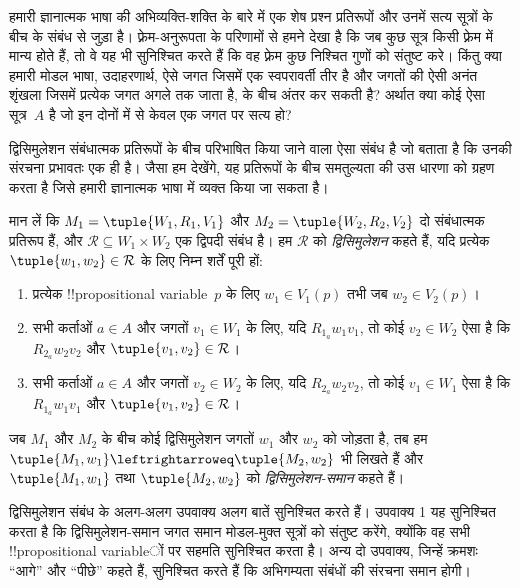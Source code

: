 \documentclass[../../../include/open-logic-section]{subfiles}
\begin{document}


हमारी ज्ञानात्मक भाषा की अभिव्यक्ति-शक्ति के बारे में एक शेष प्रश्न
प्रतिरूपों और उनमें सत्य सूत्रों के बीच के संबंध से जुड़ा है। फ़्रेम-अनुरूपता
के परिणामों से हमने देखा है कि जब कुछ सूत्र किसी फ़्रेम में मान्य होते हैं,
तो वे यह भी सुनिश्चित करते हैं कि वह फ़्रेम कुछ निश्चित गुणों को संतुष्ट
करे। किंतु क्या हमारी मोडल भाषा, उदाहरणार्थ, ऐसे जगत जिसमें एक स्वपरावर्ती
तीर है और जगतों की ऐसी अनंत शृंखला जिसमें प्रत्येक जगत अगले तक जाता है, के
बीच अंतर कर सकती है? अर्थात क्या कोई ऐसा सूत्र~$A$ है जो इन दोनों में से
केवल एक जगत पर सत्य हो?

द्विसिमुलेशन संबंधात्मक प्रतिरूपों के बीच परिभाषित किया जाने वाला ऐसा संबंध
है जो बताता है कि उनकी संरचना प्रभावतः एक ही है। जैसा हम देखेंगे, यह
प्रतिरूपों के बीच समतुल्यता की उस धारणा को ग्रहण करता है जिसे हमारी
ज्ञानात्मक भाषा में व्यक्त किया जा सकता है।

\begin{defn}[द्विसिमुलेशन]
मान लें कि $M_1 = \tuple{W_1, R_1, V_1}$ और
$M_2 = \tuple{W_2, R_2, V_2}$ दो संबंधात्मक प्रतिरूप हैं, और
$\mathcal{R} \subseteq W_1 \times W_2$ एक द्विपदी संबंध है। हम
$\mathcal{R}$ को \emph{द्विसिमुलेशन} कहते हैं, यदि प्रत्येक
$\tuple{w_1, w_2} \in \mathcal{R}$ के लिए निम्न शर्तें पूरी हों:

\begin{enumerate}
  \item प्रत्येक !!{propositional variable}~$p$ के लिए $w_1 \in V_1(p)$ तभी
  जब $w_2 \in V_2(p)$।
  \item सभी कर्ताओं $a \in A$ और जगतों $v_1 \in W_1$ के लिए, यदि
  $R_{1_a} w_1 v_1$, तो कोई $v_2 \in W_2$ ऐसा है कि
  $R_{2_a} w_2 v_2$ और $\tuple{v_1, v_2} \in \mathcal{R}$।
  \item सभी कर्ताओं $a \in A$ और जगतों $v_2 \in W_2$ के लिए, यदि
  $R_{2_a} w_2 v_2$, तो कोई $v_1 \in W_1$ ऐसा है कि
  $R_{1_a} w_1 v_1$ और $\tuple{v_1, v_2} \in \mathcal{R}$।
\end{enumerate}

जब $M_1$ और $M_2$ के बीच कोई द्विसिमुलेशन जगतों $w_1$ और $w_2$ को जोड़ता
है, तब हम $\tuple{M_1, w_1} \leftrightarroweq \tuple{M_2, w_2}$ भी लिखते
हैं और $\tuple{M_1, w_1}$ तथा $\tuple{M_2, w_2}$ को
\emph{द्विसिमुलेशन-समान} कहते हैं।
\end{defn}

द्विसिमुलेशन संबंध के अलग-अलग उपवाक्य अलग बातें सुनिश्चित करते हैं। उपवाक्य
1 यह सुनिश्चित करता है कि द्विसिमुलेशन-समान जगत समान मोडल-मुक्त सूत्रों को
संतुष्ट करेंगे, क्योंकि वह सभी !!{propositional variable}ों पर सहमति सुनिश्चित
करता है। अन्य दो उपवाक्य, जिन्हें क्रमशः ``आगे'' और ``पीछे'' कहते हैं,
सुनिश्चित करते हैं कि अभिगम्यता संबंधों की संरचना समान होगी।
\end{document}
